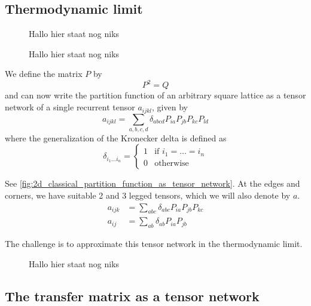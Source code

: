\subsection{Thermodynamic limit}
\begin{figure}
  
  \caption{Hallo hier staat nog niks}
  \label{fig:q_to_p}
\end{figure}

\begin{figure}
  
  \caption{Hallo hier staat nog niks}
  \label{fig:q_to_p}
\end{figure}

We define the matrix $P$ by
\begin{equation}
  P^2 = Q
\end{equation}
and can now write the partition function of an arbitrary square lattice as a tensor
network of a single recurrent tensor $a_{i j k l}$, given by
\begin{equation}
  a_{i j k l} = \sum_{a, b, c, d} \delta_{a b c d} P_{i a} P_{j b} P_{k c} P_{l d}
\end{equation}
where the generalization of the Kronecker delta is defined as
\begin{equation}
  \delta_{i_1 \dots i_n} =
  \begin{cases}
    1 & \text{if } i_1 = \ldots = i_n \\
    0 & \text{otherwise}
  \end{cases}
\end{equation}


See \autoref{fig:2d_classical_partition_function_as_tensor_network}. At the edges and
corners, we have suitable 2 and 3 legged tensors, which we will also denote by $a$.
\begin{align*}
  a_{i j k} &= \sum_{a b c} \delta_{a b c} P_{i a} P_{j b} P_{k c} \\
  a_{i j} &= \sum_{a b} \delta_{a b} P_{i a} P_{j b}
\end{align*}

The challenge is to approximate this tensor network in the thermodynamic limit.

\begin{figure}
  \caption{Hallo hier staat nog niks}
  \label{fig:a_tensor}
\end{figure}

\subsection{The transfer matrix as a tensor network}

